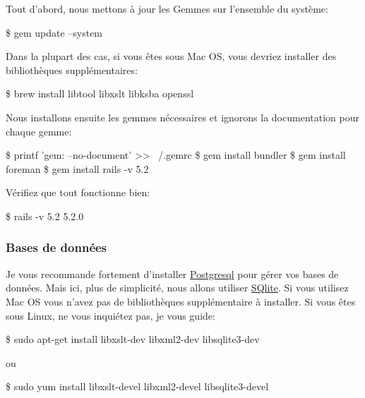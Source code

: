 \documentclass[]{report}
\begin{document}
        Tout d'abord, nous mettons à jour les Gemmes sur l'ensemble du système:

        \begin{bashcode}
        \$ gem update --system
        \end{bashcode}

        Dans la plupart des cas, si vous êtes sous Mac OS, vous devriez installer des bibliothèques supplémentaires:

        \begin{bashcode}
        \$ brew install libtool libxslt libksba openssl
        \end{bashcode}

        Nous installons ensuite les gemmes nécessaires et ignorons la documentation pour chaque gemme:

        \begin{bashcode}
        \$ printf 'gem: --no-document' >> ~/.gemrc
        \$ gem install bundler
        \$ gem install foreman
        \$ gem install rails -v 5.2
        \end{bashcode}

        Vérifiez que tout fonctionne bien:

        \begin{bashcode}
        \$ rails -v 5.2
        5.2.0
        \end{bashcode}

      \subsubsection{Bases de données}

        Je vous recommande fortement d'installer \href{http://www.postgresql.org/}{Postgresql} pour gérer vos bases de données. Mais ici, plus de simplicité, nous allons utiliser \href{http://www.sqlite.org/}{SQlite}. Si vous utilisez Mac OS vous n'avez pas de bibliothèques supplémentaire à installer. Si vous êtes sous Linux, ne vous inquiétez pas, je vous guide:

        \begin{bashcode}
        \$ sudo apt-get install libxslt-dev libxml2-dev libsqlite3-dev
        \end{bashcode}

        ou

        \begin{bashcode}
        \$ sudo yum install libxslt-devel libxml2-devel libsqlite3-devel
        \end{bashcode}
\end{document}
